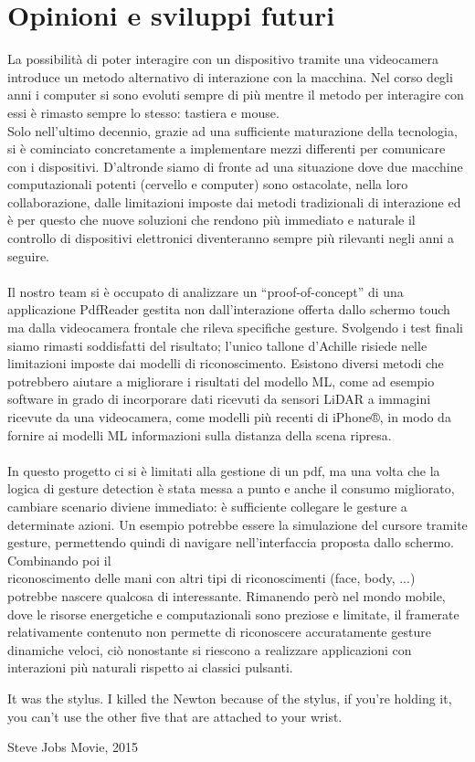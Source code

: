 \section{Opinioni e sviluppi futuri}
La possibilità di poter interagire con un dispositivo tramite una videocamera introduce un metodo alternativo di interazione con la macchina. Nel corso degli anni i computer si sono evoluti sempre di più mentre il metodo per interagire con essi è rimasto sempre lo stesso: tastiera e mouse.\\
Solo nell'ultimo decennio, grazie ad una sufficiente maturazione della tecnologia, si è cominciato concretamente a implementare mezzi differenti per comunicare con i dispositivi. D'altronde siamo di fronte ad una situazione dove due macchine computazionali potenti (cervello e computer) sono ostacolate, nella loro collaborazione, dalle limitazioni imposte dai metodi tradizionali di interazione ed è per questo che nuove soluzioni che rendono più immediato e naturale il controllo di dispositivi elettronici diventeranno sempre più rilevanti negli anni a seguire.\\
\\
\noindent Il nostro team si è occupato di analizzare un “proof-of-concept” di una applicazione PdfReader gestita non dall'interazione offerta dallo schermo touch ma dalla videocamera frontale che rileva specifiche gesture. Svolgendo i test finali siamo rimasti soddisfatti del risultato; l'unico tallone d'Achille risiede nelle limitazioni imposte dai modelli di riconoscimento.
Esistono diversi metodi che potrebbero aiutare a migliorare i risultati del modello ML, come ad esempio software in grado di incorporare dati ricevuti da sensori LiDAR a immagini ricevute da una videocamera, come modelli più recenti di iPhone®, in modo da fornire ai modelli ML informazioni sulla distanza della scena ripresa.\\
\\
\noindent In questo progetto ci si è limitati alla gestione di un pdf, ma una volta che la logica di gesture detection è stata messa a punto e anche il consumo migliorato, cambiare scenario diviene immediato: è sufficiente collegare le gesture a determinate azioni. Un esempio potrebbe essere la simulazione del cursore tramite gesture, permettendo quindi di navigare nell'interfaccia proposta dallo schermo. Combinando poi il \\
riconoscimento delle mani con altri tipi di riconoscimenti (face, body, ...) potrebbe nascere qualcosa di interessante. Rimanendo però nel mondo mobile, dove le risorse energetiche e computazionali sono preziose e limitate, il framerate relativamente contenuto non permette di riconoscere accuratamente gesture dinamiche veloci, ciò nonostante si riescono a realizzare applicazioni con interazioni più naturali rispetto ai classici pulsanti.


\epigraph{It was the stylus. I killed the Newton because of the stylus, if you're holding it, you can't use the other five that are attached to your wrist.}{Steve Jobs Movie, 2015}
